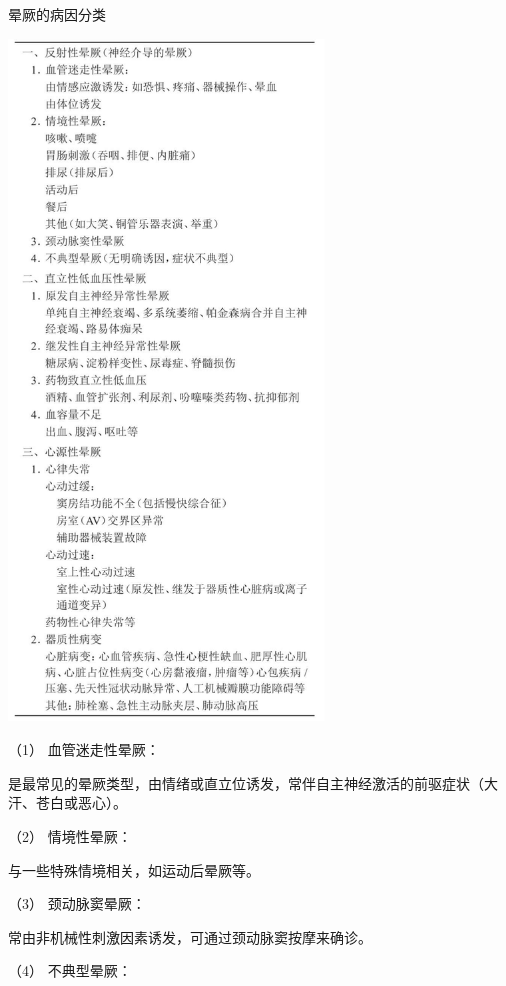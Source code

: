 \begin{table}[htbp]
\centering
\caption{晕厥的病因分类}
\label{tab4-1}
\includegraphics[width=3.30208in,height=7.11458in]{./images/Image00017.jpg}
\end{table}

\hypertarget{text00014.htmlux5cux23CHP1-4-1-1-1}{}
（1） 血管迷走性晕厥：

是最常见的晕厥类型，由情绪或直立位诱发，常伴自主神经激活的前驱症状（大汗、苍白或恶心）。

\hypertarget{text00014.htmlux5cux23CHP1-4-1-1-2}{}
（2） 情境性晕厥：

与一些特殊情境相关，如运动后晕厥等。

\hypertarget{text00014.htmlux5cux23CHP1-4-1-1-3}{}
（3） 颈动脉窦晕厥：

常由非机械性刺激因素诱发，可通过颈动脉窦按摩来确诊。

\hypertarget{text00014.htmlux5cux23CHP1-4-1-1-4}{}
（4） 不典型晕厥：

